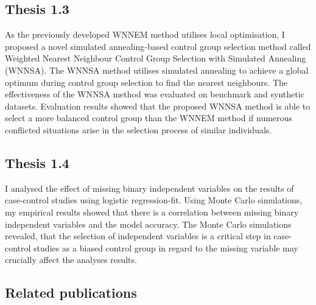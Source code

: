 				
		\subsection*{Thesis 1.3}
				        
		As the previously developed WNNEM method utilises local optimisation, I proposed a novel simulated annealing-based control group selection method called Weighted Nearest Neighbour Control Group Selection with Simulated Annealing (WNNSA). The WNNSA method utilises simulated annealing to achieve a global optimum during control group selection to find the nearest neighbours. The effectiveness of the WNNSA method was evaluated on benchmark and synthetic datasets. Evaluation results showed that the proposed WNNSA method is able to select a more balanced control group than the WNNEM method if numerous conflicted situations arise in the selection process of similar individuals.
				        
		\subsection*{Thesis 1.4}
				        
		I analysed the effect of missing binary independent variables on the results of case-control studies using logistic regression-fit. Using Monte Carlo simulations, my empirical results showed that there is a correlation between missing binary independent variables and the model accuracy. The Monte Carlo simulations revealed, that the selection of independent variables is a critical step in case-control studies as a biased control group in regard to the missing variable may crucially affect the analyses results.  
  

  
  
  
  		
		\subsection*{Related publications}
								
